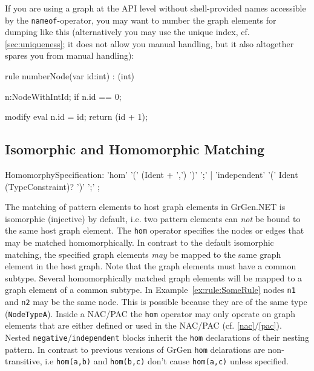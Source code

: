 \begin{note}
If you are using a graph at the API level without shell-provided names accessible by the \texttt{nameof}-operator, you may want to number the graph elements for dumping like this (alternatively you may use the unique index, cf. \ref{sec:uniqueness}; it does not allow you manual handling, but it also altogether spares you from manual handling):
\begin{grgen}
rule numberNode(var id:int) : (int)
{
  n:NodeWithIntId;
  if { n.id == 0; }

  modify {
    eval {
      n.id = id;
    }
    return (id + 1);
  }
}
\end{grgen}
\end{note}


\subsection{Isomorphic and Homomorphic Matching}\label{rule:homspec}

\begin{rail}
  HomomorphySpecification:
    'hom' '(' (Ident + ',') ')' ';' |
    'independent' '(' Ident (TypeConstraint)? ')' ';'
    ;
\end{rail}

The matching of pattern elements to host graph elements in GrGen.NET is isomorphic (injective) by default, 
i.e. two pattern elements can \emph{not} be bound to the same host graph element.
The \texttt{hom} operator specifies the nodes or edges that may be matched homomorphically.
In contrast to the default isomorphic matching, the specified graph elements \emph{may} be mapped to the same graph element in the host graph. Note that the graph elements must have a common subtype.
Several homomorphically matched graph elements will be mapped to a graph element of a common subtype.
In Example~\ref{ex:rule:SomeRule} nodes \texttt{n1} and \texttt{n2} may be the same node. This is possible because they are of the same type (\texttt{NodeTypeA}).
Inside a NAC/PAC the \texttt{hom} operator may only operate on graph elements that are either defined or used in the NAC/PAC (cf. \ref{nac}/\ref{pac}).
Nested \texttt{negative}/\texttt{independent} blocks inherit the \texttt{hom} declarations of their nesting pattern.
In contrast to previous versions of GrGen \texttt{hom} delarations are non-transitive, i.e \texttt{hom(a,b)} and \texttt{hom(b,c)} don't cause \texttt{hom(a,c)} unless specified.

